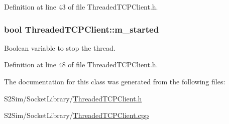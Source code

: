 Definition at line 43 of file Threaded\-T\-C\-P\-Client.\-h.

\hypertarget{class_threaded_t_c_p_client_a32d0d8b7239c8eda6ff9d4ab45de5e8e}{
\subsubsection[{m\-\_\-started}]{\setlength{\rightskip}{0pt plus 5cm}bool Threaded\-T\-C\-P\-Client\-::m\-\_\-started\hspace{0.3cm}{\ttfamily [private]}}}\label{class_threaded_t_c_p_client_a32d0d8b7239c8eda6ff9d4ab45de5e8e}


Boolean variable to stop the thread. 



Definition at line 48 of file Threaded\-T\-C\-P\-Client.\-h.



The documentation for this class was generated from the following files\-:\begin{DoxyCompactItemize}
\item 
S2\-Sim/\-Socket\-Library/\hyperlink{_threaded_t_c_p_client_8h}{Threaded\-T\-C\-P\-Client.\-h}\item 
S2\-Sim/\-Socket\-Library/\hyperlink{_threaded_t_c_p_client_8cpp}{Threaded\-T\-C\-P\-Client.\-cpp}\end{DoxyCompactItemize}
